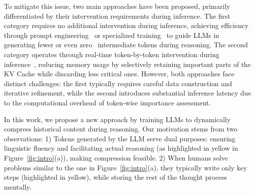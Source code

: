 To mitigate this issue, two main approaches have been proposed, primarily differentiated by their intervention requirements during inference.
The first category requires no additional intervention during inference, achieving efficiency through prompt engineering~\citep{arxiv24_tale,arxiv24_break_the_chain,arxiv24_concise_thoughts} or specialized training~\citep{nips24_skip_steps,arxiv24_c3ot,arxiv25_related_work_rl1,arxiv25_o1_pruner,arxiv24_ccot,arxiv24_coconut} to guide LLMs in generating fewer or even zero~\citep{arxiv23_kd_cot,arxiv24_icot} intermediate tokens during reasoning. %
The second category operates through real-time token-by-token intervention during inference~\citep{nips23_h2o,arxiv24_sepllm}, reducing memory usage by selectively retaining important parts of the KV Cache while discarding less critical ones.
However, both approaches face distinct challenges: the first typically requires careful data construction and iterative refinement, while the second introduces substantial inference latency due to the computational overhead of token-wise importance assessment.

In this work, we propose a new approach by training LLMs to dynamically compress historical content during reasoning. 
Our motivation stems from two observations: 
1) Tokens generated by the LLM serve dual purposes: 
ensuring linguistic fluency and facilitating actual reasoning (as highlighted in yellow in Figure~\ref{fig:intro}(a)), making compression feasible. 
2) When humans solve problems similar to the one in Figure~\ref{fig:intro}(a), they typically write only key steps (highlighted in yellow), while storing the rest of the thought process mentally.

